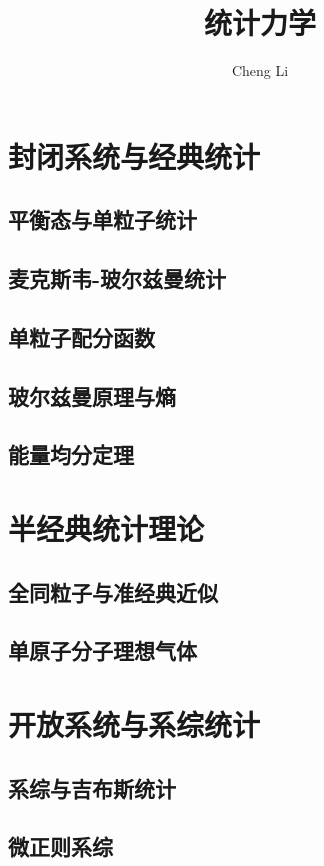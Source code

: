 \documentclass[a4paper]{report}
\author{Cheng Li}
\title{\textbf{{\Huge 统计力学}}}
\begin{document}
\maketitle
\tableofcontents



\chapter{封闭系统与经典统计}
\section{平衡态与单粒子统计}
\section{麦克斯韦-玻尔兹曼统计}
\section{单粒子配分函数}
\section{玻尔兹曼原理与熵}
\section{能量均分定理}
\chapter{半经典统计理论}
\section{全同粒子与准经典近似}
\section{单原子分子理想气体}

\chapter{开放系统与系综统计}
\section{系综与吉布斯统计}
\section{微正则系综}
\end{document}
